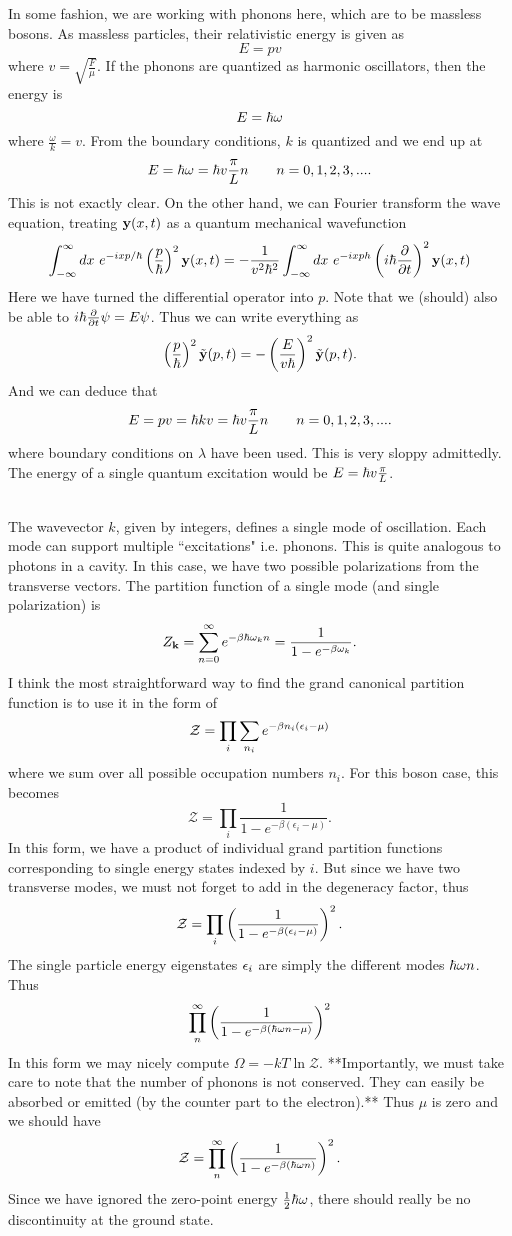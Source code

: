 \documentclass[10pt,letterpaper]{article}
\begin{document}
	\benum
	\item
	In some fashion, we are working with phonons here, which are to be massless bosons. As massless particles,
	their relativistic energy is given as
	\[
		E = pv
	\]
	where $v = \sqrt{\frac{F}{\mu}}$. If the phonons are quantized as harmonic oscillators, then the energy is 
	\[
		E = \hbar\omega
	\]
	where $\frac{\omega}{k} = v$. From the boundary conditions, $k$ is quantized and we end up at
	\[
		E = \hbar \omega = \hbar v\frac{\pi}{L}n\qquad n=0,1,2,3,....
	\]
	This is not exactly clear. On the other hand, we can Fourier transform the wave equation, treating 
	$\mathbf{y}(x,t)$ as a quantum mechanical wavefunction
	\[
		\int_{-\infty}^{\infty} dx\ e^{-ixp/\h}\pfrac{p}{\h}^2 \vect y(x,t) =-\frac{1}{v^2\h^2} 
		\int_{-\infty}^{\infty} dx\ e^{-ixp\/h}\plr{i\h\pdiff{t}}^2 \vect y(x,t)
	\]
	Here we have turned the differential operator into $p$. Note that we (should) also be able to $i\hbar\frac{\partial}{\partial t}\psi
	= E\psi$. Thus we can write everything as
	\[
		\left(\frac{p}{\hbar}\right)^2 \tilde{\mathbf{y}}(p,t) = -\left(\frac{E}{v\hbar}\right)^2\tilde{\mathbf{y}}(p,t).
	\]
	And we can deduce that
	\[
		E = pv = \hbar k v = \hbar v \frac{\pi}{L} n\qquad n=0,1,2,3,....
	\]
	where boundary conditions on $\lambda$ have been used. This is very sloppy admittedly. The energy of a single
	quantum excitation would be $E = \hbar v\frac{\pi}{L}$.
	\\ \\
	
	\item
	The wavevector $k$, given by integers, defines a single mode of oscillation. Each mode can support 
	multiple ``excitations" i.e. phonons. This is quite analogous to photons in a cavity. In this case, we have two 
	possible polarizations from the transverse vectors. The partition function of a single mode (and single polarization) 	is
	\[
		Z_{\mathbf{k}} = \sum_{n=0}^\infty e^{-\beta \hbar\omega_k n} = \frac{1}{1-e^{-\beta \omega_k}}. 
	\]
	I think the most straightforward way to find the grand canonical partition function is to use it in the form of
	\[
		\mathcal Z = \prod_i \sum_{n_i} e^{-\beta n_i(\epsilon_i-\mu)}
	\]
	where we sum over all possible occupation numbers $n_i$. For this boson case, this becomes
	\[
		\mathcal Z = \prod_i \frac{1}{1-e^{-\beta(\epsilon_i-\mu)}}.
	\]
	In this form, we have a product of individual grand partition functions corresponding to single energy states
	indexed by $i$. But since we have two transverse modes, we must not forget to add in the degeneracy 
	factor, thus
	\[
		\mathcal Z = \prod_i \left(\frac{1}{1-e^{-\beta(\epsilon_i-\mu)}}\right)^2.
	\]
	The single particle energy eigenstates $\epsilon_i$ are simply the different modes $\hbar \omega n$. Thus
	\[
		\prod_{n}^\infty \left(\frac{1}{1-e^{-\beta(\hbar\omega n-\mu)}}\right)^2
	\]
	In this form we may nicely compute $\Omega = -kT\ln \mathcal Z$. **Importantly, we must take care to
	note that the number of phonons is not conserved. They can easily be absorbed or emitted (by the counter
	part to the electron).** Thus $\mu$ is zero and we should have
	\[
		\mathcal Z = \prod_{n}^\infty \left(\frac{1}{1-e^{-\beta(\hbar\omega n)}}\right)^2.
	\]
	Since we have ignored the zero-point energy $\frac{1}2 \hbar\omega$, there should really be no discontinuity at the 	ground state.
	\\ \\
	
\end{document}
